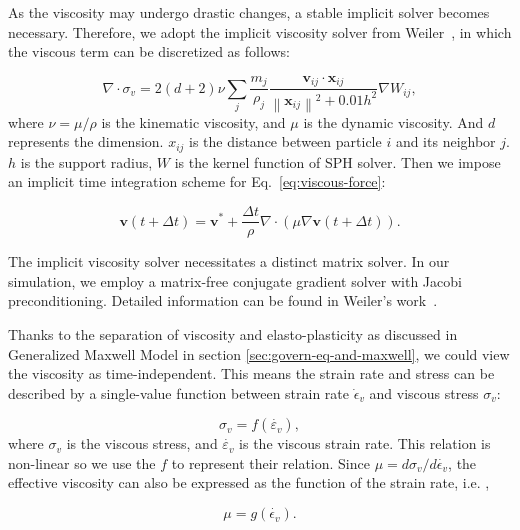 \documentclass[10pt,journal,compsoc]{IEEEtran}
\begin{document}
As the viscosity may undergo drastic changes, a stable implicit solver becomes necessary. Therefore, we adopt the implicit viscosity solver from Weiler~\cite{Weiler2018-viscosity}, in which the viscous term can be discretized as follows:


\begin{equation}
	\nabla \cdot \sigma_v= 2(d+2) \nu \sum_j \frac{m_j}{\rho_j} \frac{\mathbf{v}_{i j} \cdot \mathbf{x}_{i j}}{\left\|\mathbf{x}_{i j}\right\|^2+0.01 h^2} \nabla W_{i j}\label{eq:viscous-force},
\end{equation}
where $\nu=\mu / \rho$ is the kinematic viscosity, and $\mu$ is the dynamic viscosity. And $d$ represents the dimension. $x_{ij}$ is the distance between particle $i$ and its neighbor $j$. $h$ is the support radius, $W$ is the kernel function of SPH solver. Then we impose an implicit time integration scheme for Eq.~\ref{eq:viscous-force}:

\begin{equation}
	\mathbf{v}(t+\Delta t)=\mathbf{v}^*+\frac{\Delta t}{\rho}  \nabla\cdot(\mu \nabla \mathbf{v}(t+\Delta t)).
\end{equation}

The implicit viscosity solver necessitates a distinct matrix solver. In our simulation, we employ a matrix-free conjugate gradient solver with Jacobi preconditioning. Detailed information can be found in Weiler's work~\cite{Weiler2018-viscosity}.


Thanks to the separation of viscosity and elasto-plasticity as discussed in Generalized Maxwell Model in section \ref{sec:govern-eq-and-maxwell}, we could view the viscosity as time-independent. This means the strain rate and stress can be described by a single-value function between strain rate $\dot\epsilon_v$ and viscous stress $\sigma_v$:

\begin{equation}
	\sigma_v=f\left(\dot{\varepsilon_v}\right),
\end{equation}
where $\sigma_v$ is the viscous stress, and $\dot{\varepsilon_v}$ is the viscous strain rate. This relation is non-linear so we use the $f$ to represent their relation.
Since $\mu=d\sigma_v /d\dot{\epsilon_v}$, the effective viscosity can also be expressed as the function of the strain rate, i.e. ,


\begin{equation}
	\mu=g\left(\dot{\epsilon_v}\right). \label{eq:mu_epsilon}
\end{equation}
\end{document}
